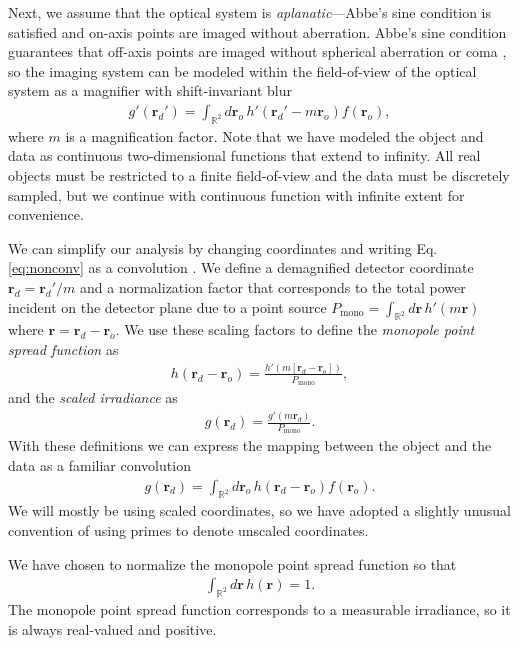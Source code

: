 \documentclass[]{osa-article}
\providecommand{\mb}[1]{\mathbf{#1}}
\providecommand{\ro}{\mathbf{\mathbf{r}}_o}
\providecommand{\rd}{\mathbf{r}_d}
\providecommand{\mbb}[1]{\mathbb{#1}}
\begin{document}
Next, we assume that the optical system is \textit{aplanatic}---Abbe's sine
condition is satisfied and on-axis points are imaged without aberration. Abbe's
sine condition guarantees that off-axis points are imaged without spherical
aberration or coma \cite{mansuripur2009}, so the imaging system can be modeled
within the field-of-view of the optical system as a magnifier with
shift-invariant blur
\begin{align}
  g'(\rd') = \int_{\mbb{R}^2}d\ro\, h'(\rd' - m\ro)f(\ro), \label{eq:nonconv}
\end{align}
where $m$ is a magnification factor. Note that we have modeled the object and
data as continuous two-dimensional functions that extend to infinity. All real
objects must be restricted to a finite field-of-view and the data must be
discretely sampled, but we continue with continuous function with infinite
extent for convenience.

We can simplify our analysis by changing coordinates and writing Eq.
\ref{eq:nonconv} as a convolution \cite{barrett2004}. We define a demagnified
detector coordinate $\rd = \rd'/m$ and a normalization factor that corresponds
to the total power incident on the detector plane due to a point source
$P_{\text{mono}} = \int_{\mbb{R}^2}d\mb{r}\,h'(m\mb{r})$ where
$\mb{r} = \rd - \ro$. We use these scaling factors to define the
\textit{monopole point spread function} as
\begin{align}
  h(\rd - \ro) = \frac{h'(m[\rd - \ro])}{P_{\text{mono}}},
\end{align}
and the \textit{scaled irradiance} as
\begin{align}
  g(\rd) = \frac{g'(m\rd)}{P_{\text{mono}}}.
\end{align}
With these definitions we can express the mapping between the object and the
data as a familiar convolution
\begin{align}
  g(\rd) = \int_{\mbb{R}^2}d\ro\, h(\rd - \ro)f(\ro).  \label{eq:lsi}
\end{align}
We will mostly be using scaled coordinates, so we have adopted a slightly
unusual convention of using primes to denote unscaled coordinates.

We have chosen to normalize the monopole point spread function so that
\begin{align}
  \int_{\mbb{R}^2}d\mb{r}\, h(\mb{r}) = 1. \label{eq:norm}
\end{align}
The monopole point spread function corresponds to a
measurable irradiance, so it is always real-valued and positive.
\end{document}
